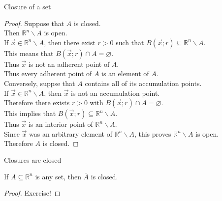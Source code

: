 \documentclass{beamer}
\begin{document}
\begin{frame}{Closure of a set}
\begin{proof}
Suppose that $A$ is closed.\\
\pause
Then $\mathbb{R}^n\backslash A$ is open.\\
\pause
If $\vec x\in \mathbb{R}^n\backslash A$, then there exist $r > 0$ such that $B(\vec x; r)\subseteq \mathbb{R}^n\backslash A$.\\
\pause
This means that $B(\vec x; r)\cap A = \varnothing$.\\
\pause
Thus $\vec x$ is not an adherent point of $A$.\\
\pause
Thus every adherent point of $A$ is an element of $A$.\\
\pause
Conversely, suppse that $A$ contains all of its accumulation points.\\
\pause
If $\vec x\in \mathbb R^n\backslash A$, then $\vec x$ is not an accumulation point.\\
\pause
Therefore there exists $r > 0$ with $B(\vec x; r)\cap A = \varnothing$.\\
\pause
This implies that $B(\vec x; r)\subseteq \mathbb R^n\backslash A$.\\
\pause
Thus $\vec x$ is an interior point of $\mathbb R^n\backslash A$.\\
\pause
Since $\vec x$ was an arbitrary element of $\mathbb R^n\backslash A$, this proves $\mathbb R^n\backslash A$ is open.\\
\pause
Therefore $A$ is closed.
\end{proof}
\end{frame}

\begin{frame}{Closures are closed}
\begin{thm}
If $A\subseteq \mathbb{R}^n$ is any set, then $\overline{A}$ is closed.
\end{thm}
\begin{proof}
Exercise!
\end{proof}
\end{frame}
\end{document}
